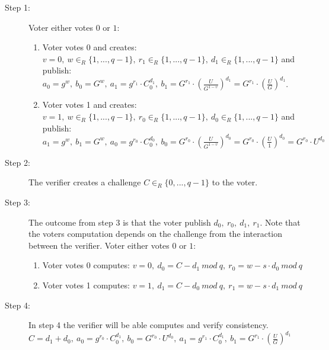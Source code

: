 \begin{description}
    \item[Step 1:] Voter either votes $0$ or $1$:
                    \begin{enumerate}
                        \item  Voter votes 0 and creates: \begin{math}v=0,\ w\in_R \{1,...,q-1\},\ r_1\in_R\{1,...,q-1\},\ d_1\in_R\{1,...,q-1\}\end{math} and 
                                publish: \begin{math}a_0 = g^w,\ b_0 = G^w,\ a_1 = g^{r_1} \cdot C^{d_1}_0,\ b_1 = G^{r_1}  \cdot  (\frac{U}{G^{1-v}})^{d_1} = G^{r_1}  \cdot  (\frac{U}{G})^{d_1} \end{math}.
                        \item  Voter votes 1 and creates: \begin{math}v=1,\ w\in_R \{1,...,q-1\},\ r_0\in_R\{1,...,q-1\},\ d_0\in_R\{1,...,q-1\}\end{math} and publish: \begin{math}a_1 = g^w,\ b_1 = G^w,\ a_0 = g^{r_0} \cdot C^{d_0}_0,\ b_0 = G^{r_0}  \cdot  (\frac{U}{G^{1-v}})^{d_0}=  G^{r_0}  \cdot (\frac{U}{1})^{d_0}  =  G^{r_0}  \cdot  U^{d_0} \end{math}
                    \end{enumerate}

    

    
    \item[Step 2:] The verifier creates a challenge \begin{math}C\in_R \{0,...,q-1\}\end{math} to the voter.
    

    
    
    \item[Step 3:] The outcome from step 3 is that the voter publish \begin{math}d_0,\ r_0,\ d_1,\ r_1\end{math}. Note that the voters computation depends on the challenge from the interaction between the verifier. Voter either votes $0$ or $1$:
        \begin{enumerate}
            \item  Voter votes 0 computes: \begin{math}v=0,\ d_0= C-d_1\ mod\ q, \ r_0=w-s \cdot d_0 \ mod\ q\end{math}
            \item  Voter votes 1 computes: \begin{math}v=1,\ d_1= C-d_0\ mod\ q, \ r_1=w-s \cdot d_1 \ mod\ q\end{math}
        \end{enumerate}
    
        
    \item[Step 4:] In step 4 the verifier will be able computes and verify consistency.
    \begin{math}C = d_1 + d_0,\ a_0=g^{r_0}  \cdot  C^{d_1}_0,\ b_0 = G^{r_0} \cdot U^{d_0},\ a_1=g^{r_1}  \cdot  C^{d_1}_0,\ b_1= G^{r_1}  \cdot (\frac{U}{G})^{d_1}\end{math}
\end{description}

